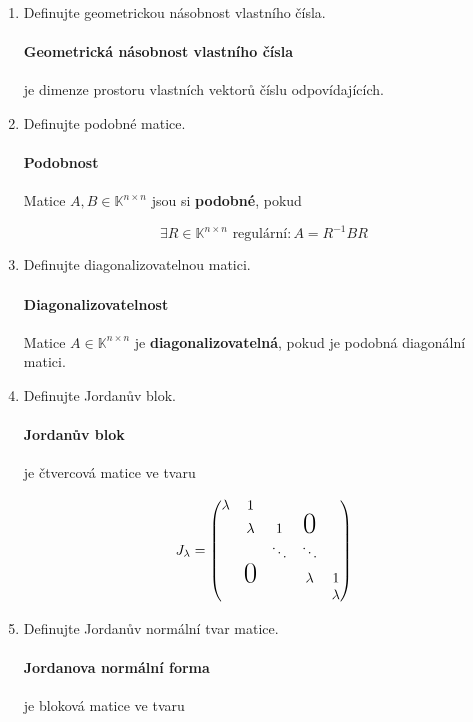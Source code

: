 \documentclass[10pt,a4paper]{article}
\theoremstyle{plain}
\theoremstyle{definition}
\begin{document}
\begin{enumerate}
\item Definujte geometrickou násobnost vlastního čísla.

\paragraph{Geometrická násobnost vlastního čísla} je dimenze prostoru vlastních vektorů číslu odpovídajících.

\item Definujte podobné matice.

\paragraph{Podobnost} Matice $A,B \in \mathbb{K}^{n \times n}$ jsou si \textbf{podobné}, pokud

\[ \exists R \in \mathbb{K}^{n \times n} \text{ regulární}: A = R^{-1}BR\]

\item Definujte diagonalizovatelnou matici.

\paragraph{Diagonalizovatelnost} Matice $A \in \mathbb{K}^{n \times n}$ je \textbf{diagonalizovatelná}, pokud je podobná diagonální matici.

\item Definujte Jordanův blok.

\paragraph{Jordanův blok} je čtvercová matice ve tvaru

\[ J_\lambda = \begin{pmatrix}
\lambda & 1		  &  	   & 		 &   \\
 		& \lambda & 1  	   & \mbox{\huge{0}}		 &   \\
		& 		  & \ddots & \ddots  &   \\
		& \mbox{\huge{0}}& 		   & \lambda & 1 \\
		& 		  & 		   & 		 & \lambda 
\end{pmatrix} \]

\item Definujte Jordanův normální tvar matice.

\paragraph{Jordanova normální forma} je bloková matice ve tvaru


\end{enumerate}
\end{document}
